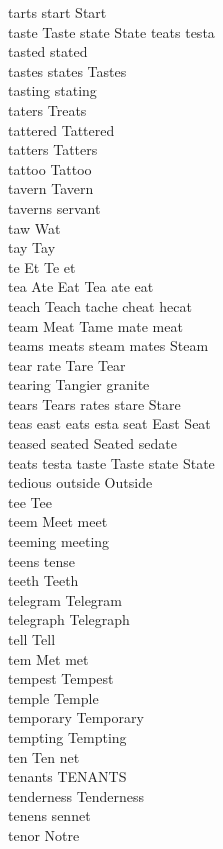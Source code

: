 tarts start Start\\
taste Taste state State teats testa\\
tasted stated\\
tastes states Tastes\\
tasting stating\\
taters Treats\\
tattered Tattered\\
tatters Tatters\\
tattoo Tattoo\\
tavern Tavern\\
taverns servant\\
taw Wat\\
tay Tay\\
te Et Te et\\
tea Ate Eat Tea ate eat\\
teach Teach tache cheat hecat\\
team Meat Tame mate meat\\
teams meats steam mates Steam\\
tear rate Tare Tear\\
tearing Tangier granite\\
tears Tears rates stare Stare\\
teas east eats esta seat East Seat\\
teased seated Seated sedate\\
teats testa taste Taste state State\\
tedious outside Outside\\
tee Tee\\
teem Meet meet\\
teeming meeting\\
teens tense\\
teeth Teeth\\
telegram Telegram\\
telegraph Telegraph\\
tell Tell\\
tem Met met\\
tempest Tempest\\
temple Temple\\
temporary Temporary\\
tempting Tempting\\
ten Ten net\\
tenants TENANTS\\
tenderness Tenderness\\
tenens sennet\\
tenor Notre\\
